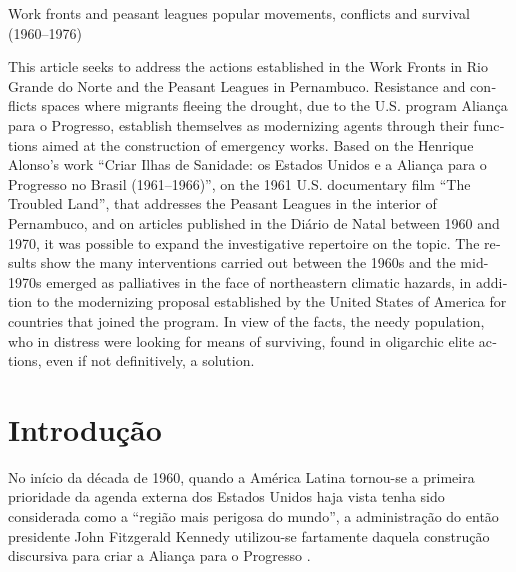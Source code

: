 \begin{refsection}
    
    \begin{otherlanguage}{english}
    
    \fakeChapterTwoLines
    {Work fronts and peasant leagues}
    {popular movements, conflicts and survival (1960--1976)}

    \begin{galoResumo}[Abstract]
        This article seeks to address the actions established in the Work Fronts in Rio Grande do Norte and the Peasant Leagues in Pernambuco. Resistance and conflicts spaces where migrants fleeing the drought, due to the U.S. program Aliança para o Progresso, establish themselves as modernizing agents through their functions aimed at the construction of emergency works. Based on the Henrique Alonso's work ``Criar Ilhas de Sanidade: os Estados Unidos e a Aliança para o Progresso no Brasil (1961--1966)'', on the 1961 U.S. documentary film ``The Troubled Land'', that addresses the Peasant Leagues in the interior of Pernambuco, and on articles published in the Diário de Natal between 1960 and 1970, it was possible to expand the investigative repertoire on the topic. The results show the many interventions carried out between the 1960s and the mid-1970s emerged as palliatives in the face of northeastern climatic hazards, in addition to the modernizing proposal established by the United States of America for countries that joined the program. In view of the facts, the needy population, who in distress were looking for means of surviving, found in oligarchic elite actions, even if not definitively, a solution.
    \end{galoResumo}
    
    \end{otherlanguage}

    \section{Introdução}

    No início da década de 1960, quando a América Latina tornou-se a primeira prioridade da agenda externa dos Estados Unidos haja vista tenha sido considerada como a ``região mais perigosa do mundo'', a administração do então presidente John Fitzgerald Kennedy utilizou-se fartamente daquela construção discursiva para criar a Aliança para o Progresso \cite[p.~25--26]{Pereira2005Criar}.


\end{refsection}
